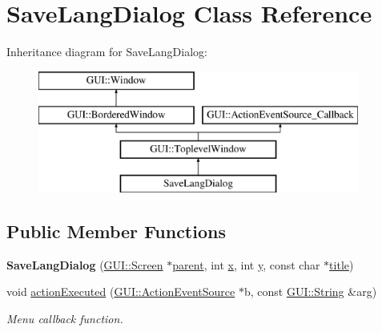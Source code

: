 \hypertarget{classSaveLangDialog}{\section{Save\-Lang\-Dialog Class Reference}
\label{classSaveLangDialog}
}
Inheritance diagram for Save\-Lang\-Dialog\-:\begin{figure}[H]
\begin{center}
\leavevmode
\includegraphics[height=4.000000cm]{classSaveLangDialog}
\end{center}
\end{figure}
\subsection*{Public Member Functions}
\begin{DoxyCompactItemize}
\item 
\hypertarget{classSaveLangDialog_ac2c69e59a4076f106f0d1aeb375e1dd4}{{\bfseries Save\-Lang\-Dialog} (\hyperlink{classGUI_1_1Screen}{G\-U\-I\-::\-Screen} $\ast$\hyperlink{classGUI_1_1Window_a2e593ff65e7702178d82fe9010a0b539}{parent}, int \hyperlink{classGUI_1_1Window_a6ca6a80ca00c9e1d8ceea8d3d99a657d}{x}, int \hyperlink{classGUI_1_1Window_a0ee8e923aff2c3661fc2e17656d37adf}{y}, const char $\ast$\hyperlink{classGUI_1_1ToplevelWindow_a04de191f9a57b5b584657866a4ac6843}{title})}\label{classSaveLangDialog_ac2c69e59a4076f106f0d1aeb375e1dd4}

\item 
\hypertarget{classSaveLangDialog_aebf160f57b67dce3f0dc2ebac87e9f27}{void \hyperlink{classSaveLangDialog_aebf160f57b67dce3f0dc2ebac87e9f27}{action\-Executed} (\hyperlink{classGUI_1_1ActionEventSource}{G\-U\-I\-::\-Action\-Event\-Source} $\ast$b, const \hyperlink{classGUI_1_1String}{G\-U\-I\-::\-String} \&arg)}\label{classSaveLangDialog_aebf160f57b67dce3f0dc2ebac87e9f27}

\begin{DoxyCompactList}\small\item\em Menu callback function. \end{DoxyCompactList}\end{DoxyCompactItemize}
